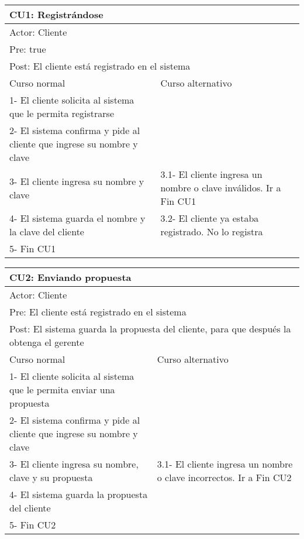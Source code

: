 \begin{table}[H]
  \begin{adjustbox}{max width = \textwidth}
  \begin{tabular}{|l|l|}
  \hline
  \multicolumn{2}{|l|}{CU1: Registrándose} \\\hline
  \multicolumn{2}{|l|}{Actor: Cliente} \\\hline
  \multicolumn{2}{|l|}{Pre: true} \\\hline
  \multicolumn{2}{|l|}{Post: El cliente está registrado en el sistema} \\\hline
   Curso normal & Curso alternativo\\ \hline
   1- El cliente solicita al sistema que le permita registrarse & \\ \hline
   2- El sistema confirma y pide al cliente que ingrese su nombre y clave & \\ \hline
   3- El cliente ingresa su nombre y clave & 3.1- El cliente ingresa un nombre o clave inválidos. Ir a Fin CU1\\ \hline
   4- El sistema guarda el nombre y la clave del cliente & 3.2- El cliente ya estaba registrado. No lo registra\\ \hline
   5- Fin CU1 & \\ \hline
  \end{tabular}
  \end{adjustbox}
\end{table}

\begin{table}[H]
  \begin{adjustbox}{max width = \textwidth}
  \begin{tabular}{|l|l|}
    \hline
    \multicolumn{2}{|l|}{CU2: Enviando propuesta} \\\hline
    \multicolumn{2}{|l|}{Actor: Cliente} \\\hline
    \multicolumn{2}{|l|}{Pre: El cliente está registrado en el sistema} \\\hline
    \multicolumn{2}{|l|}{Post: El sistema guarda la propuesta del cliente, para que después la obtenga el gerente} \\\hline
     Curso normal & Curso alternativo\\ \hline
     1- El cliente solicita al sistema que le permita enviar una propuesta & \\ \hline
     2- El sistema confirma y pide al cliente que ingrese su nombre y clave & \\ \hline
     3- El cliente ingresa su nombre, clave y su propuesta  & 3.1- El cliente ingresa un nombre o clave incorrectos. Ir a Fin CU2\\ \hline
     4- El sistema guarda la propuesta del cliente & \\ \hline
     5- Fin CU2 & \\ \hline
  \end{tabular}
  \end{adjustbox}
\end{table}

